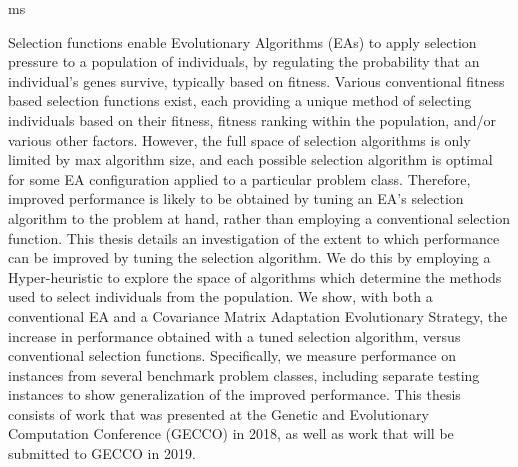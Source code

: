 \documentclass[times,12pt,titlepage]{mstogs}
\begin{document}

\begin{ThesisTitlePage}{ms}


\author{\MakeUppercase{Samuel Nathan Richter}}







\end{ThesisTitlePage}



\begin{ThesisAbstract}
Selection functions enable Evolutionary Algorithms (EAs) to apply selection pressure to a population of individuals, by regulating the probability that an individual's genes survive, typically based on fitness. Various conventional fitness based selection functions exist, each providing a unique method of selecting individuals based on their fitness, fitness ranking within the population, and/or various other factors. However, the full space of selection algorithms is only limited by max algorithm size, and each possible selection algorithm is optimal for some EA configuration applied to a particular problem class. Therefore, improved performance is likely to be obtained by tuning an EA's selection algorithm to the problem at hand, rather than employing a conventional selection function. This thesis details an investigation of the extent to which performance can be improved by tuning the selection algorithm. We do this by employing a Hyper-heuristic to explore the space of algorithms which determine the methods used to select individuals from the population. We show, with both a conventional EA and a Covariance Matrix Adaptation Evolutionary Strategy, the increase in performance obtained with a tuned selection algorithm, versus conventional selection functions. Specifically, we measure performance on instances from several benchmark problem classes, including separate testing instances to show generalization of the improved performance. This thesis consists of work that was presented at the Genetic and Evolutionary Computation Conference (GECCO) in 2018, as well as work that will be submitted to GECCO in 2019. 
\end{ThesisAbstract}
\end{document}
